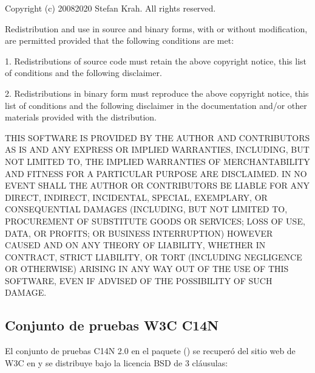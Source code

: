 \documentclass[a4,10pt,spanish]{sphinxmanual}
\begin{document}
\begin{sphinxVerbatim}[commandchars=\\\{\}]
Copyright (c) 2008\PYGZhy{}2020 Stefan Krah. All rights reserved.

Redistribution and use in source and binary forms, with or without
modification, are permitted provided that the following conditions
are met:

1. Redistributions of source code must retain the above copyright
   notice, this list of conditions and the following disclaimer.

2. Redistributions in binary form must reproduce the above copyright
   notice, this list of conditions and the following disclaimer in the
   documentation and/or other materials provided with the distribution.

THIS SOFTWARE IS PROVIDED BY THE AUTHOR AND CONTRIBUTORS \PYGZdq{}AS IS\PYGZdq{} AND
ANY EXPRESS OR IMPLIED WARRANTIES, INCLUDING, BUT NOT LIMITED TO, THE
IMPLIED WARRANTIES OF MERCHANTABILITY AND FITNESS FOR A PARTICULAR PURPOSE
ARE DISCLAIMED.  IN NO EVENT SHALL THE AUTHOR OR CONTRIBUTORS BE LIABLE
FOR ANY DIRECT, INDIRECT, INCIDENTAL, SPECIAL, EXEMPLARY, OR CONSEQUENTIAL
DAMAGES (INCLUDING, BUT NOT LIMITED TO, PROCUREMENT OF SUBSTITUTE GOODS
OR SERVICES; LOSS OF USE, DATA, OR PROFITS; OR BUSINESS INTERRUPTION)
HOWEVER CAUSED AND ON ANY THEORY OF LIABILITY, WHETHER IN CONTRACT, STRICT
LIABILITY, OR TORT (INCLUDING NEGLIGENCE OR OTHERWISE) ARISING IN ANY WAY
OUT OF THE USE OF THIS SOFTWARE, EVEN IF ADVISED OF THE POSSIBILITY OF
SUCH DAMAGE.
\end{sphinxVerbatim}


\subsection{Conjunto de pruebas W3C C14N}
\label{\detokenize{license:w3c-c14n-test-suite}}
\sphinxAtStartPar
El conjunto de pruebas C14N 2.0 en el paquete  () se recuperó del sitio web de W3C en  y se distribuye bajo la licencia BSD de 3 cláusulas:
\end{document}
